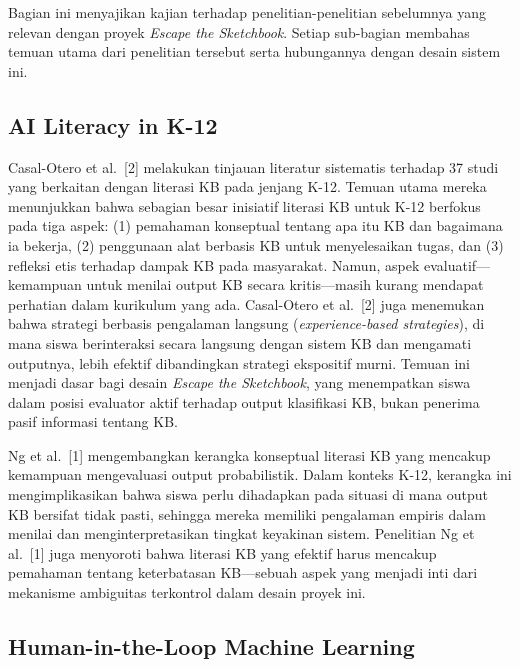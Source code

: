 Bagian ini menyajikan kajian terhadap penelitian-penelitian sebelumnya yang relevan dengan proyek \textit{Escape the Sketchbook}. Setiap sub-bagian membahas temuan utama dari penelitian tersebut serta hubungannya dengan desain sistem ini.

\subsection{AI Literacy in K-12}
\label{subsec:penelitian-ai-literacy-k12}

Casal-Otero et al.\ [2] melakukan tinjauan literatur sistematis terhadap 37 studi yang berkaitan dengan literasi KB pada jenjang K-12. Temuan utama mereka menunjukkan bahwa sebagian besar inisiatif literasi KB untuk K-12 berfokus pada tiga aspek: (1) pemahaman konseptual tentang apa itu KB dan bagaimana ia bekerja, (2) penggunaan alat berbasis KB untuk menyelesaikan tugas, dan (3) refleksi etis terhadap dampak KB pada masyarakat. Namun, aspek evaluatif---kemampuan untuk menilai output KB secara kritis---masih kurang mendapat perhatian dalam kurikulum yang ada. Casal-Otero et al.\ [2] juga menemukan bahwa strategi berbasis pengalaman langsung (\textit{experience-based strategies}), di mana siswa berinteraksi secara langsung dengan sistem KB dan mengamati outputnya, lebih efektif dibandingkan strategi ekspositif murni. Temuan ini menjadi dasar bagi desain \textit{Escape the Sketchbook}, yang menempatkan siswa dalam posisi evaluator aktif terhadap output klasifikasi KB, bukan penerima pasif informasi tentang KB.

Ng et al.\ [1] mengembangkan kerangka konseptual literasi KB yang mencakup kemampuan mengevaluasi output probabilistik. Dalam konteks K-12, kerangka ini mengimplikasikan bahwa siswa perlu dihadapkan pada situasi di mana output KB bersifat tidak pasti, sehingga mereka memiliki pengalaman empiris dalam menilai dan menginterpretasikan tingkat keyakinan sistem. Penelitian Ng et al.\ [1] juga menyoroti bahwa literasi KB yang efektif harus mencakup pemahaman tentang keterbatasan KB---sebuah aspek yang menjadi inti dari mekanisme ambiguitas terkontrol dalam desain proyek ini.

\subsection{Human-in-the-Loop Machine Learning}
\label{subsec:penelitian-hitl-ml}

